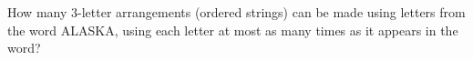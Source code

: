 How many $3$-letter arrangements (ordered strings) can be made using letters from the word ALASKA, using each letter at most as many times as it appears in the word?
